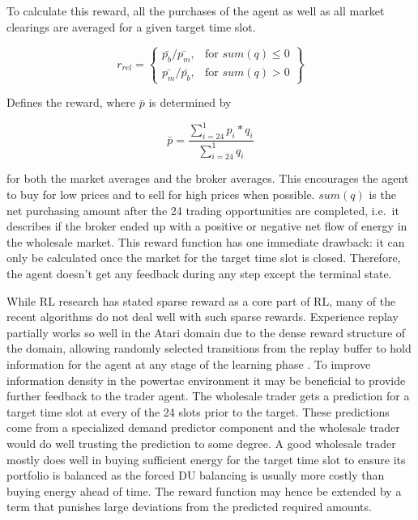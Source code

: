 To calculate this reward, all the purchases of the agent as well as all market clearings are averaged for a given target
time slot.

\begin{equation}
    r_{rel} = \left\{
        \begin{array}{lr}
            \bar{p_b} / \bar{p_m}, & \text{for } sum(q) \leq 0 \\
            \bar{p_m} / \bar{p_b}, & \text{for } sum(q) > 0
    \end{array}\right\}
\end{equation}

Defines the reward, where $\bar{p}$ is determined by

\begin{equation}
    \bar{p} =\frac{\sum ^{1}_{i=24} p_{i} *q_{i}}{\sum ^{1}_{i=24} q_{i}}
\end{equation}

for both the market averages and the broker averages. This encourages the agent to buy for low prices and to sell for high
prices when possible. $sum(q)$ is the net purchasing amount after the 24 trading opportunities are completed, i.e.\ it
describes if
the broker ended up with a positive or negative net flow of energy in the wholesale market. This reward function has one
immediate drawback: it can only be calculated once the market for the target time slot is closed. Therefore, the agent 
doesn't get any feedback during any step except the terminal state.

While \ac{RL} research has stated sparse reward as a core part of \ac{RL}, many of the recent algorithms do
not deal well with such sparse rewards. Experience replay partially works so well in the Atari domain due to the dense
reward structure of the domain, allowing randomly selected transitions from the replay buffer to hold information for
the agent at any stage of the learning phase \cite[]{schaul2015prioritized}.
To improve information density in the powertac environment it may be beneficial to provide further feedback to the
trader agent. The wholesale trader gets a prediction for a target time slot at every of the 24 slots prior to the
target. These predictions come from a specialized demand predictor component and the wholesale trader would do well 
trusting the prediction to some degree. A good wholesale trader mostly does well in buying sufficient energy for the target
time slot to ensure its portfolio is balanced as the forced \ac{DU} balancing is usually more costly than buying energy
ahead of time. The reward function may hence be extended by a term that punishes large
deviations from the predicted required amounts.


